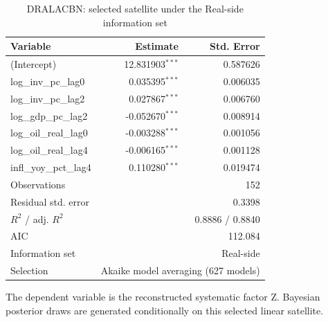 \begin{table}[!htbp]
\centering
\caption{DRALACBN: selected satellite under the Real-side information set}
\label{tab:dralacbn_real_side_satellite}
\begin{tabular}{lrr}
\toprule
Variable & Estimate & Std. Error \\
\midrule
(Intercept) & 12.831903$^{***}$ & 0.587626 \\
log_inv_pc_lag0 & 0.035395$^{***}$ & 0.006035 \\
log_inv_pc_lag2 & 0.027867$^{***}$ & 0.006760 \\
log_gdp_pc_lag2 & -0.052670$^{***}$ & 0.008914 \\
log_oil_real_lag0 & -0.003288$^{***}$ & 0.001056 \\
log_oil_real_lag4 & -0.006165$^{***}$ & 0.001128 \\
infl_yoy_pct_lag4 & 0.110280$^{***}$ & 0.019474 \\
\midrule
Observations & \multicolumn{2}{r}{152} \\
Residual std. error & \multicolumn{2}{r}{0.3398} \\
$R^2$ / adj. $R^2$ & \multicolumn{2}{r}{0.8886 / 0.8840} \\
AIC & \multicolumn{2}{r}{112.084} \\
Information set & \multicolumn{2}{r}{Real-side} \\
Selection & \multicolumn{2}{r}{Akaike model averaging (627 models)} \\
\bottomrule
\end{tabular}
\begin{tablenotes}
\small
\item The dependent variable is the reconstructed systematic factor Z. Bayesian posterior draws are generated conditionally on this selected linear satellite.
\end{tablenotes}
\end{table}
